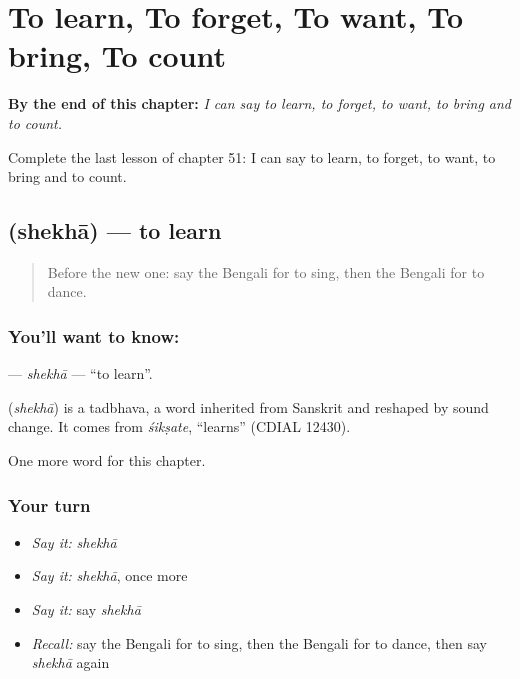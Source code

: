 
\chapter{To learn, To forget, To want, To bring, To count}
\label{ch:bn-to-learn-to-forget-to-want-to-bring-to-count}

\begin{chapteropening}
\textbf{By the end of this chapter:} \emph{I can say to learn, to forget, to want, to bring and to count.}

Complete the last lesson of chapter 51: I can say to learn, to forget, to want, to bring and to count.
\end{chapteropening}

\section[\texorpdfstring{\bn{শেখা} (shekhā)}{শেখা (shekhā)}]{ (shekhā) — to learn}

\label{lesson:BN-C51-shekha}



\begin{quote}
Before the new one: say the Bengali for to sing, then the Bengali for to dance.
\end{quote}

\subsection*{You'll want to know: }
\textbf{} — \emph{shekhā} — \textquotedblleft{}to learn\textquotedblright{}.

\begin{cousinweb}
\textbf{} (\emph{shekhā}) is a tadbhava, a word inherited from Sanskrit and reshaped by sound change. It comes from \emph{śikṣate}, \textquotedblleft{}learns\textquotedblright{} (CDIAL 12430).
\end{cousinweb}

\begin{grammarlens}[title={What you've built}]
One more word for this chapter.
\end{grammarlens}

\subsection*{Your turn}
\begin{itemize}
\raggedright
  \item \emph{Say it:} \emph{shekhā}
  \item \emph{Say it:} \emph{shekhā}, once more
  \item \emph{Say it:} say \emph{shekhā}
  \item \emph{Recall:} say the Bengali for to sing, then the Bengali for to dance, then say \emph{shekhā} again
\end{itemize}

